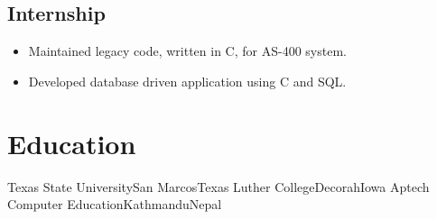 \documentclass[11pt,letterpaper,sans]{moderncv}
\begin{document}
  \subsection{Internship}
     {\begin{itemize}
         \item Maintained legacy code, written in C, for AS-400 system.
         \item Developed database driven application using C and SQL.
     \end{itemize}}



\section{Education}
           {Texas State University}{San Marcos}{Texas}{}
           {Luther College}{Decorah}{Iowa}{}
           {Aptech Computer Education}{Kathmandu}{Nepal}{}


\end{document}
